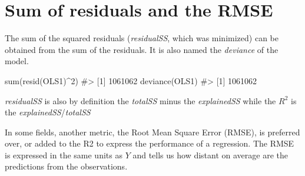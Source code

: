 \documentclass[
  letterpaper,
  DIV=11,
  numbers=noendperiod]{scrreprt}
\newenvironment{Shaded}{\begin{snugshade}}{\end{snugshade}}
\newcommand{\CommentTok}[1]{\textcolor[rgb]{0.37,0.37,0.37}{#1}}
\newcommand{\DecValTok}[1]{\textcolor[rgb]{0.68,0.00,0.00}{#1}}
\newcommand{\FunctionTok}[1]{\textcolor[rgb]{0.28,0.35,0.67}{#1}}
\newcommand{\NormalTok}[1]{\textcolor[rgb]{0.00,0.23,0.31}{#1}}
\newcommand{\OtherTok}[1]{\textcolor[rgb]{0.00,0.23,0.31}{#1}}
\newcommand{\SpecialCharTok}[1]{\textcolor[rgb]{0.37,0.37,0.37}{#1}}
\begin{document}
\section{Sum of residuals and the
RMSE}\label{sum-of-residuals-and-the-rmse}

The sum of the squared residuals (\emph{residualSS}, which was
minimized) can be obtained from the sum of the residuals. It is also
named the \emph{deviance} of the model.

\begin{Shaded}
\begin{Highlighting}[]
\FunctionTok{sum}\NormalTok{(}\FunctionTok{resid}\NormalTok{(OLS1)}\SpecialCharTok{\^{}}\DecValTok{2}\NormalTok{)}
\CommentTok{\#\textgreater{} [1] 1061062}
\FunctionTok{deviance}\NormalTok{(OLS1)}
\CommentTok{\#\textgreater{} [1] 1061062}
\end{Highlighting}
\end{Shaded}

\emph{residualSS} is also by definition the \emph{totalSS} minus the
\emph{explainedSS} while the \(R^2\) is the
\emph{explainedSS}/\emph{totalSS}

\begin{Shaded}
\end{Shaded}

In some fields, another metric, the Root Mean Square Error (RMSE), is
preferred over, or added to the R2 to express the performance of a
regression. The RMSE is expressed in the same units as \(Y\) and tells
us how distant on average are the predictions from the observations.
\end{document}

